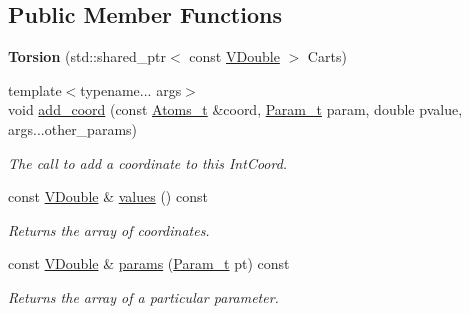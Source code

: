 \subsection*{Public Member Functions}
\begin{DoxyCompactItemize}
\item 
{\bfseries Torsion} (std\+::shared\+\_\+ptr$<$ const \hyperlink{classFManII_1_1IntCoords_af42df2795dec16350f908cfd5ac2ef06}{V\+Double} $>$ Carts)\hypertarget{classFManII_1_1Torsion_a28059ff2757f4ee3c353c7abed109db8}{}\label{classFManII_1_1Torsion_a28059ff2757f4ee3c353c7abed109db8}

\item 
{\footnotesize template$<$typename... args$>$ }\\void \hyperlink{classFManII_1_1IntCoords_aaa13717daa2c47a00c56e8dcb18896b6}{add\+\_\+coord} (const \hyperlink{classFManII_1_1IntCoords_a59ab25571f774fca97644a2ce5ade359}{Atoms\+\_\+t} \&coord, \hyperlink{namespaceFManII_ab331802fde4c5f2564443f1704c25363}{Param\+\_\+t} param, double pvalue, args...\+other\+\_\+params)
\begin{DoxyCompactList}\small\item\em The call to add a coordinate to this Int\+Coord. \end{DoxyCompactList}\item 
const \hyperlink{classFManII_1_1IntCoords_af42df2795dec16350f908cfd5ac2ef06}{V\+Double} \& \hyperlink{classFManII_1_1IntCoords_a8b36508bebeb262d2c41bed1301ad9f9}{values} () const \hypertarget{classFManII_1_1IntCoords_a8b36508bebeb262d2c41bed1301ad9f9}{}\label{classFManII_1_1IntCoords_a8b36508bebeb262d2c41bed1301ad9f9}

\begin{DoxyCompactList}\small\item\em Returns the array of coordinates. \end{DoxyCompactList}\item 
const \hyperlink{classFManII_1_1IntCoords_af42df2795dec16350f908cfd5ac2ef06}{V\+Double} \& \hyperlink{classFManII_1_1IntCoords_ac107ad541179d838052f37538883671a}{params} (\hyperlink{namespaceFManII_ab331802fde4c5f2564443f1704c25363}{Param\+\_\+t} pt) const \hypertarget{classFManII_1_1IntCoords_ac107ad541179d838052f37538883671a}{}\label{classFManII_1_1IntCoords_ac107ad541179d838052f37538883671a}

\begin{DoxyCompactList}\small\item\em Returns the array of a particular parameter. \end{DoxyCompactList}\end{DoxyCompactItemize}

